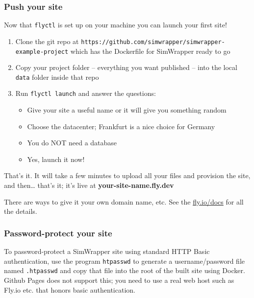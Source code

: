 \hypertarget{push-your-site}{%
\subsubsection{Push your site}\label{push-your-site}}

Now that \texttt{flyctl} is set up on your machine you can launch your
first site!

\begin{enumerate}
\def\labelenumi{\arabic{enumi}.}
\tightlist
\item
  Clone the git repo at
  \texttt{https://github.com/simwrapper/simwrapper-example-project}
  which has the Dockerfile for SimWrapper ready to go
\item
  Copy your project folder -- everything you want published -- into the
  local \texttt{data} folder inside that repo
\item
  Run \texttt{flyctl\ launch} and answer the questions:

  \begin{itemize}
  \tightlist
  \item
    Give your site a useful name or it will give you something random
  \item
    Choose the datacenter; Frankfurt is a nice choice for Germany
  \item
    You do NOT need a database
  \item
    Yes, launch it now!
  \end{itemize}
\end{enumerate}

That's it. It will take a few minutes to upload all your files and
provision the site, and then\ldots{} that's it; it's live at
\textbf{your-site-name.fly.dev}

There are ways to give it your own domain name, etc. See the
\href{https://fly.io/docs}{fly.io/docs} for all the details.

\hypertarget{password-protect-your-site}{%
\subsubsection{Password-protect your
site}\label{password-protect-your-site}}

To password-protect a SimWrapper site using standard HTTP Basic
authentication, use the program \texttt{htpasswd} to generate a
username/password file named \texttt{.htpasswd} and copy that file into
the root of the built site using Docker. Github Pages does not support
this; you need to use a real web host such as Fly.io etc. that honors
basic authentication.

